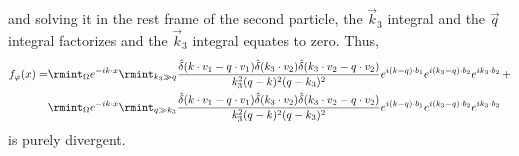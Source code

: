 and solving it in the rest frame of the second particle, the $\vec{k}_{3}$ integral and the $\vec{q}$ integral factorizes and the $\vec{k}_{3}$ integral equates to zero. Thus, 
\begin{align}
    \begin{split} \label{nocont}
    f_{\varphi}(x) =&
\rmint_{\Omega}e^{-i k\cdot x}\rmint_{k_3\gg q} \frac{\hat\delta(k\cdot v_1-q\cdot v_1)\hat\delta(k_3\cdot v_2)\hat\delta(k_3\cdot v_2-q\cdot v_2)}{k_3^2 (q-k)^2(q-k_3)^2}e^{i (k-q)\cdot b_1}e^{i(k_3-q)\cdot b_2}e^{ik_3\cdot b_2}\, + \\
&\rmint_{\Omega}e^{-i k\cdot x}\rmint_{q\gg 
k_3} \frac{\hat\delta(k\cdot v_1-q\cdot v_1)\hat\delta(k_3\cdot v_2)\hat\delta(k_3\cdot v_2-q\cdot v_2)}{k_3^2 (q-k)^2(q-k_3)^2}e^{i (k-q)\cdot b_1}e^{i(k_3-q)\cdot b_2}e^{ik_3\cdot b_2}
 \end{split}
\end{align}
is purely divergent. %
